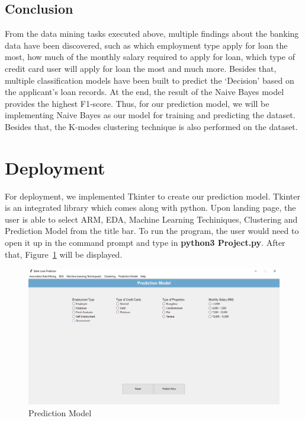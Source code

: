 \documentclass[11pt]{article}
\begin{document}
\clearpage
\subsection{Conclusion}
From the data mining tasks executed above, multiple findings about the banking data have been discovered, such as which employment type apply for loan the most, how much of the monthly salary required to apply for loan, which type of credit card user will apply for loan the most and much more. Besides that, multiple classification models have been built to predict the `Decision' based on the applicant's loan records. At the end, the result of the Naive Bayes model provides the highest F1-score. Thus, for our prediction model, we will be implementing Naive Bayes as our model for training and predicting the dataset. Besides that, the K-modes clustering technique is also performed on the dataset.  

\clearpage
\section{Deployment}
For deployment, we implemented Tkinter to create our prediction model. Tkinter is an integrated library which comes along with python. Upon landing page, the user is able to select ARM, EDA, Machine Learning Techiniques, Clustering and Prediction Model from the title bar. To run the program, the user would need to open it up in the command prompt and type in \textbf{python3 Project.py}. After that, Figure~\ref{fig:deployPm} will be displayed.

\begin{figure}[h]
\centerline{\includegraphics[scale=0.35]{deploy_pm.PNG}}
\caption{Prediction Model}
\label{fig:deployPm}
\end{figure}

\clearpage
\end{document}
